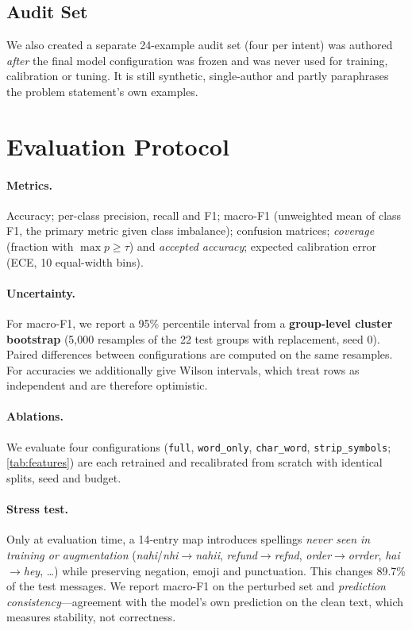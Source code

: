 \documentclass[11pt,a4paper]{article}
\theoremstyle{remark}
\newcommand{\lbl}[1]{\texttt{#1}}                      %
\newcommand{\hi}[1]{\textit{#1}}                       %
\begin{document}
\subsection{Audit Set}
We also created a separate 24-example audit set (four per intent) was authored \emph{after} the
final model configuration was frozen and was never used for training,
calibration or tuning. It is still synthetic, single-author and partly
paraphrases the problem statement's own examples.

\section{Evaluation Protocol}
\label{sec:protocol}

\paragraph{Metrics.} Accuracy; per-class precision, recall and F1; macro-F1
(unweighted mean of class F1, the primary metric given class imbalance);
confusion matrices; \emph{coverage} (fraction with $\max p\ge\tau$) and
\emph{accepted accuracy}; expected calibration error (ECE, 10 equal-width bins).

\paragraph{Uncertainty.} For macro-F1, we report a 95\% percentile interval from a
\textbf{group-level cluster bootstrap} (5{,}000 resamples of the 22 test groups
with replacement, seed 0). Paired differences between configurations are
computed on the same resamples. For accuracies we additionally give Wilson
intervals, which treat rows as independent and are therefore optimistic.

\paragraph{Ablations.} We evaluate four configurations (\lbl{full}, \lbl{word\_only},
\lbl{char\_word}, \lbl{strip\_symbols}; \cref{tab:features}) are each
retrained and recalibrated from scratch with identical splits, seed and budget.

\paragraph{Stress test.} Only at evaluation time, a 14-entry map introduces
spellings \emph{never seen in training or augmentation}
(\hi{nahi}/\hi{nhi}$\to$\hi{nahii}, \hi{refund}$\to$\hi{refnd},
\hi{order}$\to$\hi{orrder}, \hi{hai}$\to$\hi{hey}, \dots) while preserving
negation, emoji and punctuation. This changes 89.7\% of the test messages. We report
macro-F1 on the perturbed set and \emph{prediction consistency}---agreement
with the model's own prediction on the clean text, which measures stability,
not correctness.
\end{document}
